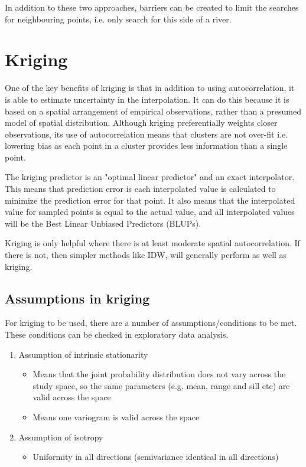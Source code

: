 \documentclass{article}
\begin{document}
In addition to these two approaches, barriers can be created to limit the searches for neighbouring points, i.e. only search for this side of a river.

\section{Kriging}

One of the key benefits of kriging is that in addition to using autocorrelation, it is able to estimate uncertainty in the interpolation.
It can do this because it is based on a spatial arrangement of empirical observations, rather than a presumed model of spatial distribution.
Although kriging preferentially weights closer observations, its use of autocorrelation means that clusters are not over-fit i.e. lowering bias as each point in a cluster provides less information than a single point.

The kriging predictor is an "optimal linear predictor" and an exact interpolator.
This means that prediction error is each interpolated value is calculated to minimize the prediction error for that point.
It also means that the interpolated value for sampled points is equal to the actual value, and all interpolated values will be the Best Linear Unbiased Predictors (BLUPs).

Kriging is only helpful where there is at least moderate spatial autocorrelation.
If there is not, then simpler methods like IDW, will generally perform as well as kriging.

\subsection{Assumptions in kriging}

\begin{center}
\end{center}

For kriging to be used, there are a number of assumptions/conditions to be met.
These conditions can be checked in exploratory data analysis.

\begin{enumerate}
    \item Assumption of intrinsic stationarity
    \begin{itemize}
        \item Means that the joint probability distribution does not vary across the study space, so the same parameters (e.g. mean, range and sill etc) are valid across the space
        \item Means one variogram is valid across the space
    \end{itemize}
    \item Assumption of isotropy
    \begin{itemize}
        \item Uniformity in all directions (semivariance identical in all directions)
    \end{itemize}
\end{enumerate}
\end{document}
